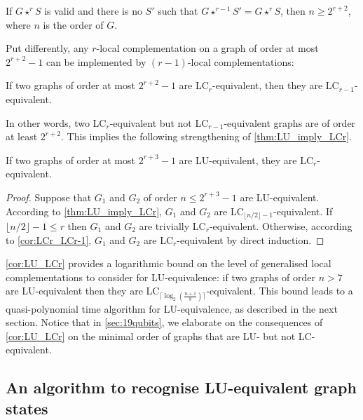 \documentclass[a4paper,UKenglish,cleveref,autoref,thm-restate]{arxiv}
\newcommand{\ls}{\leqslant}
\newcommand{\gs}{\geqslant}
\begin{document}
\begin{proposition} \label{prop:boundlevel}
    If $G\star^r S$ is valid and there is no $S'$ such that $G\star^{r-1} S' = G \star^r S$, then $n \gs 2^{r+2}$, where $n$ is the order of $G$.
\end{proposition}

Put differently, any $r$-local complementation on a graph of order at most $2^{r+2}-1$ can be implemented by $(r-1)$-local complementations:

\begin{corollary} \label{cor:LCr_LCr-1}
    If two graphs of order at most $2^{r+2}-1$ are LC$_r$-equivalent, then they are LC$_{r-1}$-equivalent.
\end{corollary}

In other words, two LC$_r$-equivalent but not LC$_{r-1}$-equivalent graphs are of order at least $2^{r+2}$. This implies the following strengthening of \cref{thm:LU_imply_LCr}.

\begin{corollary} \label{cor:LU_LCr}
    If two graphs of order at most $2^{r+3}-1$ are LU-equivalent, they are LC$_r$-equivalent. 
\end{corollary}

\begin{proof}
    Suppose that $G_1$ and $G_2$ of order $n \ls 2^{r+3}-1$ are LU-equivalent. According to \cref{thm:LU_imply_LCr}, $G_1$ and $G_2$ are LC$_{\lfloor n/2 \rfloor-1}$-equivalent. If $\lfloor n/2 \rfloor-1 \ls r$ then $G_1$ and $G_2$ are trivially LC$_r$-equivalent. Otherwise, according to \cref{cor:LCr_LCr-1}, $G_1$ and $G_2$ are LC$_r$-equivalent by direct induction. 
\end{proof}

\cref{cor:LU_LCr} provides a logarithmic bound on the level of generalised local complementations to consider for LU-equivalence: if two graphs of order $n>7$ are LU-equivalent then they are LC$_{\lceil \log_2(\frac{n+1}8)\rceil}$-equivalent. This bound leads to a quasi-polynomial time algorithm for LU-equivalence, as described in the next section. Notice that in \cref{sec:19qubits}, we elaborate on the consequences of \cref{cor:LU_LCr} on the minimal order of graphs that are LU- but not LC-equivalent. 

\subsection{An algorithm to recognise LU-equivalent graph states} \label{subsec:algorithm_lu}
\end{document}
